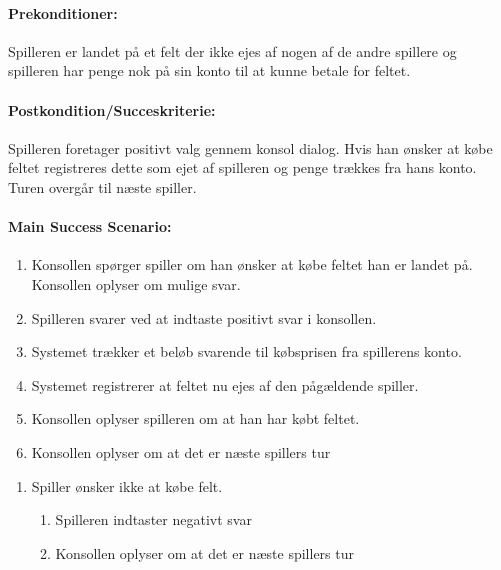 \paragraph{Prekonditioner:} 
Spilleren er landet på et felt der ikke ejes af nogen af de andre spillere og spilleren har penge nok på sin konto til at kunne betale for feltet.

\paragraph{Postkondition/Succeskriterie:}
Spilleren foretager positivt valg gennem konsol dialog. Hvis han ønsker at købe feltet registreres dette som ejet af spilleren og penge trækkes fra hans konto. Turen overgår til næste spiller.

\paragraph{Main Success Scenario:} 

\begin{enumerate}
\item Konsollen spørger spiller om han ønsker at købe feltet han er landet på. Konsollen oplyser om mulige svar.
\item Spilleren svarer ved at indtaste positivt svar i konsollen.
\item Systemet trækker et beløb svarende til købsprisen fra spillerens konto.
\item Systemet registrerer at feltet nu ejes af den pågældende spiller.
\item Konsollen oplyser spilleren om at han har købt feltet.
\item Konsollen oplyser om at det er næste spillers tur
\end{enumerate} 

\begin{enumerate}[2a]
\item Spiller ønsker ikke at købe felt.
	\begin{enumerate}[1.]
	\item Spilleren indtaster negativt svar 
	\item Konsollen oplyser om at det er næste spillers tur
	\end{enumerate}
\end{enumerate}








